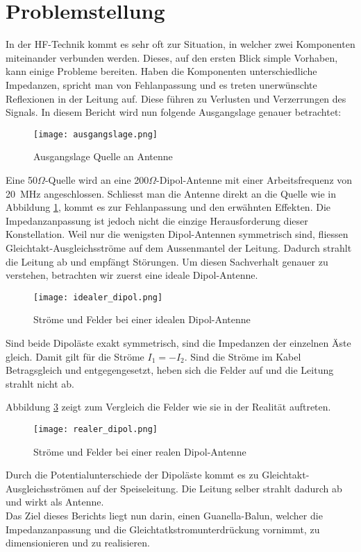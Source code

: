 \section{Problemstellung}
In der HF-Technik kommt es sehr oft zur Situation, in welcher zwei Komponenten miteinander verbunden werden. Dieses, auf den ersten Blick simple Vorhaben, kann einige Probleme bereiten. Haben die Komponenten unterschiedliche Impedanzen, spricht man von Fehlanpassung und es treten unerwünschte Reflexionen in der Leitung auf. Diese führen zu Verlusten und Verzerrungen des Signals. In diesem Bericht wird nun folgende Ausgangslage genauer betrachtet:
\begin{figure}[h]
	\centering
	\texttt{[image: ausgangslage.png]}
	\caption{Ausgangslage Quelle an Antenne}\label{fig:ausgangslage}
\end{figure}

Eine 50$\Omega$-Quelle wird an eine 200$\Omega$-Dipol-Antenne mit einer Arbeitsfrequenz von \SI{20}{MHz} angeschlossen. Schliesst man die Antenne direkt an die Quelle wie in Abbildung \ref{fig:ausgangslage}, kommt es zur Fehlanpassung und den erwähnten Effekten. Die Impedanzanpassung ist jedoch nicht die einzige Herausforderung dieser Konstellation.
\newline
Weil nur die wenigsten Dipol-Antennen symmetrisch sind, fliessen Gleichtakt-Ausgleichsströme auf dem Aussenmantel der Leitung. Dadurch strahlt die Leitung ab und empfängt Störungen. Um diesen Sachverhalt genauer zu verstehen, betrachten wir zuerst eine ideale Dipol-Antenne.

\begin{figure}[H]
	\centering
	\texttt{[image: idealer\_dipol.png]}
	\caption{Ströme und Felder bei einer idealen Dipol-Antenne}\label{fig:idealer_dipol}
\end{figure}

Sind beide Dipoläste exakt symmetrisch, sind die Impedanzen der einzelnen Äste gleich. Damit gilt für die Ströme $I_{1}=-I_{2}$. Sind die Ströme im Kabel Betragsgleich und entgegengesetzt, heben sich die Felder auf und die Leitung strahlt nicht ab.

Abbildung \ref{fig:realer_dipol} zeigt zum Vergleich die Felder wie sie in der Realität auftreten.
\begin{figure}[H]
	\centering
	\texttt{[image: realer\_dipol.png]}
	\caption{Ströme und Felder bei einer realen Dipol-Antenne}\label{fig:realer_dipol}
\end{figure}

Durch die Potentialunterschiede der Dipoläste kommt es zu Gleichtakt-Ausgleichsströmen auf der Speiseleitung. Die Leitung selber strahlt dadurch ab und wirkt als Antenne. \\

Das Ziel dieses Berichts liegt nun darin, einen Guanella-Balun, welcher die Impedanzanpassung und die Gleichtatkstromunterdrückung vornimmt, zu dimensionieren und zu realisieren. \cite{balun_work}